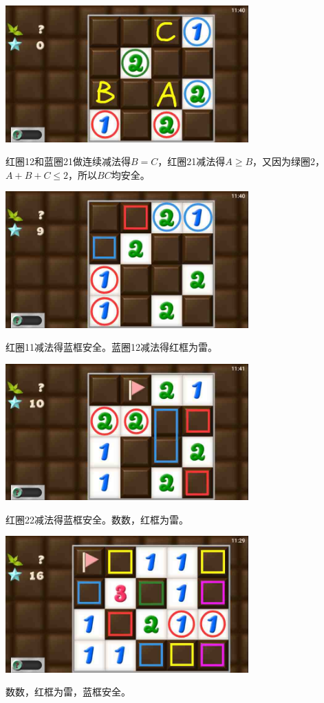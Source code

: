 \subsection{} %
\begin{center}
    \includegraphics[width=0.7\textwidth]{puzzlelow/167-1.jpg}
\end{center}
红圈12和蓝圈21做连续减法得$B=C$，红圈21减法得$A\ge B$，又因为绿圈2，$A+B+C\le 2$，所以$BC$均安全。
\begin{center}
    \includegraphics[width=0.7\textwidth]{puzzlelow/167-2.jpg}
\end{center}
红圈11减法得蓝框安全。蓝圈12减法得红框为雷。
\begin{center}
    \includegraphics[width=0.7\textwidth]{puzzlelow/167-3.jpg}
\end{center}
红圈22减法得蓝框安全。数数，红框为雷。
\begin{center}
    \includegraphics[width=0.7\textwidth]{puzzlelow/165-4.jpg}
\end{center}
数数，红框为雷，蓝框安全。

